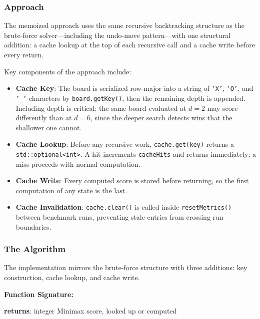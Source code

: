 \documentclass[conference]{IEEEtran}
\begin{document}
\subsubsection{Approach}
The memoized approach uses the same recursive backtracking structure as
the brute-force solver---including the undo-move pattern---with one
structural addition: a cache lookup at the top of each recursive call
and a cache write before every return.

Key components of the approach include:
\begin{itemize}
    \item \textbf{Cache Key}: The board is serialized row-major into a
    string of \texttt{'X'}, \texttt{'O'}, and \texttt{'\_'} characters
    by \texttt{board.getKey()}, then the remaining depth is appended.
    Including depth is critical: the same board evaluated at $d = 2$ may
    score differently than at $d = 6$, since the deeper search detects
    wins that the shallower one cannot.
    \item \textbf{Cache Lookup}: Before any recursive work,
    \texttt{cache.get(key)} returns a \texttt{std::optional<int>}.
    A hit increments \texttt{cacheHits} and returns immediately; a miss
    proceeds with normal computation.
    \item \textbf{Cache Write}: Every computed score is stored before
    returning, so the first computation of any state is the last.
    \item \textbf{Cache Invalidation}: \texttt{cache.clear()} is called
    inside \texttt{resetMetrics()} between benchmark runs, preventing
    stale entries from crossing run boundaries.
\end{itemize}

\subsubsection{The Algorithm}
The implementation mirrors the brute-force structure with three additions:
key construction, cache lookup, and cache write.

\textbf{Function Signature:}

\begin{algorithm}[htbp]
\caption{Function Signature (DP Memoized)}
\begin{algorithmic}[1]
\State \textbf{returns}: integer Minimax score, looked up or computed
\EndProcedure
\end{algorithmic}
\end{algorithm}
\end{document}
